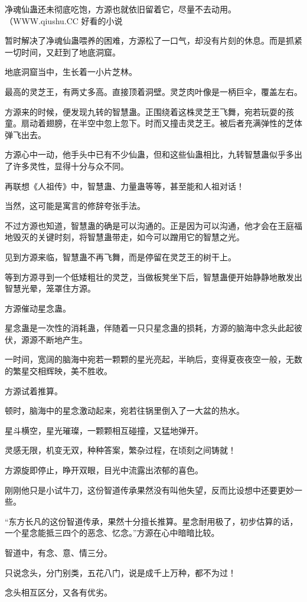 \begin{this_body}
净魂仙蛊还未彻底吃饱，方源也就依旧留着它，尽量不去动用。（WWW.qiushu.CC 好看的小说

暂时解决了净魂仙蛊喂养的困难，方源松了一口气，却没有片刻的休息。而是抓紧一切时间，又赶到了地底洞窟。

地底洞窟当中，生长着一小片芝林。

最高的灵芝王，有两丈多高。直接顶着洞壁。灵芝肉叶像是一柄巨伞，覆盖左右。

方源来的时候，便发现九转的智慧蛊。正围绕着这株灵芝王飞舞，宛若玩耍的孩童。扇动着翅膀，在半空中忽上忽下。时而又撞击灵芝王。被后者充满弹性的芝体弹飞出去。

方源心中一动，他手头中已有不少仙蛊，但和这些仙蛊相比，九转智慧蛊似乎多出了许多灵性，显得十分与众不同。

再联想《人祖传》中，智慧蛊、力量蛊等等，甚至能和人祖对话！

当然，这可能是寓言的修辞夸张手法。

不过方源也知道，智慧蛊的确是可以沟通的。正是因为可以沟通，他才会在王庭福地毁灭的关键时刻，将智慧蛊带走，如今可以蹭用它的智慧之光。

见到方源来临，智慧蛊不再飞舞，而是停留在灵芝王的树干上。

等到方源寻到一个低矮粗壮的灵芝，当做板凳坐下后，智慧蛊便开始静静地散发出智慧光晕，笼罩住方源。

方源催动星念蛊。

星念蛊是一次性的消耗蛊，伴随着一只只星念蛊的损耗，方源的脑海中念头此起彼伏，源源不断地产生。

一时间，宽阔的脑海中宛若一颗颗的星光亮起，半晌后，变得夏夜夜空一般，无数的繁星交相辉映，美不胜收。

方源试着推算。

顿时，脑海中的星念激动起来，宛若往锅里倒入了一大盆的热水。

星斗横空，星光璀璨，一颗颗相互碰撞，又猛地弹开。

灵感无限，机变无双，种种答案，繁杂过程，在顷刻之间铸就！

方源旋即停止，睁开双眼，目光中流露出浓郁的喜色。

刚刚他只是小试牛刀，这份智道传承果然没有叫他失望，反而比设想中还要更妙一些。

“东方长凡的这份智道传承，果然十分擅长推算。星念耐用极了，初步估算的话，一个星念能抵三四个的恶念、忆念。”方源在心中暗暗比较。

智道中，有念、意、情三分。

只说念头，分门别类，五花八门，说是成千上万种，都不为过！

念头相互区分，又各有优劣。


\end{this_body}
